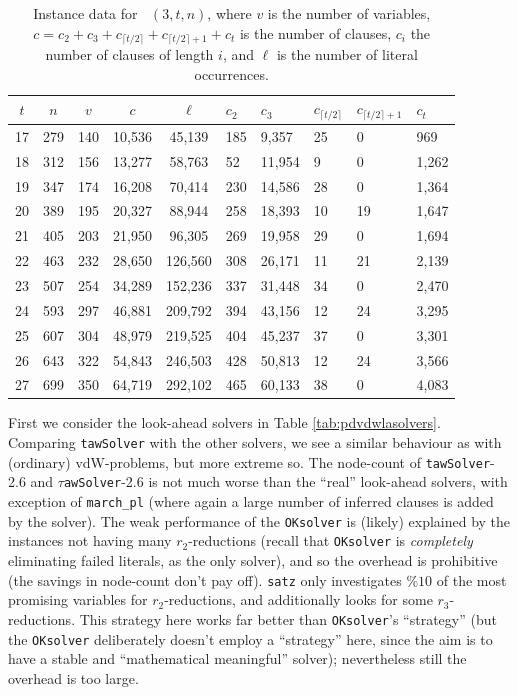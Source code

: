 \documentclass[final,3p,times]{elsarticle}
\theoremstyle{definition}
\newcommand{\ceil}[1]{\lceil #1 \rceil}
\newcommand{\tawsolver}{\texttt{tawSolver}}
\newcommand{\ntawsolver}{\tawsolver-2.6}
\newcommand{\ttawsolver}{$\tau$\texttt{awSolver}-2.6}
\newcommand{\oksolver}{\texttt{OKsolver}}
\newcommand{\satz}{\texttt{satz}}
\newcommand{\march}{\texttt{march\_pl}}
\DeclareMathOperator{\Fpd}{\mathit{F}^{pd}}
\begin{document}
\begin{table}[H]
  \centering
  \begin{tabular}{c|c||c|c|c|lllll}
    $t$ & $n$ & $v$ & $c$ & $\ell$ & $c_2$ & $c_3$ & $c_{\ceil{t/2}}$ & $c_{\ceil{t/2}+1}$ & $c_t$\\
    \hline
    17 & 279 & 140 & 10,536 & 45,139 & 185 & 9,357 & 25 & 0 & 969\\
    18 & 312 & 156 & 13,277 & 58,763 & 52 & 11,954 & 9 & 0 & 1,262\\
    19 & 347 & 174 & 16,208 & 70,414 & 230 & 14,586 & 28 & 0 & 1,364\\
    20 & 389 & 195 & 20,327 & 88,944 & 258 & 18,393 & 10 & 19 & 1,647\\
    21 & 405 & 203 & 21,950 & 96,305 & 269 & 19,958 & 29 & 0 & 1,694\\
    22 & 463 & 232 & 28,650 & 126,560 & 308 & 26,171 & 11 & 21 & 2,139\\
    23 & 507 & 254 & 34,289 & 152,236 & 337 & 31,448 & 34 & 0 & 2,470\\
    24 & 593 & 297 & 46,881 & 209,792 & 394 & 43,156 & 12 & 24 & 3,295\\
    25 & 607 & 304 & 48,979 & 219,525 & 404 & 45,237 & 37 & 0 & 3,301\\
    26 & 643 & 322 & 54,843 & 246,503 & 428 & 50,813 & 12 & 24 & 3,566\\
    27 & 699 & 350 & 64,719 & 292,102 & 465 & 60,133 & 38 & 0 & 4,083
  \end{tabular}
  \caption{Instance data for $\Fpd(3,t,n)$, where $v$ is the number of variables, $c=c_2 + c_3 + c_{\ceil{t/2}} + c_{\ceil{t/2}+1} + c_t$ is the number of clauses, $c_i$ the number of clauses of length $i$, and $\ell$ is the number of literal occurrences.}
  \label{tab:pdvdwdata}
\end{table}

First we consider the look-ahead solvers in Table \ref{tab:pdvdwlasolvers}. Comparing \tawsolver{} with the other solvers, we see a similar behaviour as with (ordinary) vdW-problems, but more extreme so. The node-count of \ntawsolver{} and \ttawsolver{} is not much worse than the ``real'' look-ahead solvers, with exception of \march{} (where again a large number of inferred clauses is added by the solver). The weak performance of the \oksolver{} is (likely) explained by the instances not having many $r_2$-reductions (recall that \oksolver{} is \emph{completely} eliminating failed literals, as the only solver), and so the overhead is prohibitive (the savings in node-count don't pay off). \satz{} only investigates $\%10$ of the most promising variables for $r_2$-reductions, and additionally looks for some $r_3$-reductions. This strategy here works far better than \oksolver's ``strategy'' (but the \oksolver{} deliberately doesn't employ a ``strategy'' here, since the aim is to have a stable and ``mathematical meaningful'' solver); nevertheless still the overhead is too large.
\end{document}
